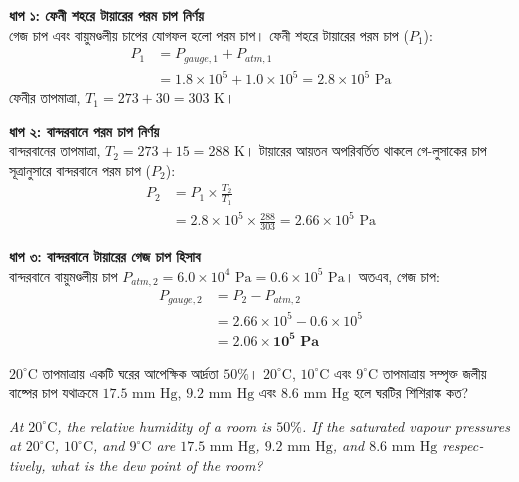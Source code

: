 \documentclass[12pt, a4paper]{article}
\begin{document}
\begin{tcolorbox}[solutionbox={সমাধান (Solution)}]
    \noindent
    \textbf{ধাপ ১: ফেনী শহরে টায়ারের পরম চাপ নির্ণয়} \\
    গেজ চাপ এবং বায়ুমণ্ডলীয় চাপের যোগফল হলো পরম চাপ। ফেনী শহরে টায়ারের পরম চাপ ($P_1$):
    \begin{align*}
        P_1 &= P_{gauge,1} + P_{atm,1} \\
        &= 1.8 \times 10^5 + 1.0 \times 10^5 = 2.8 \times 10^5\text{ Pa}
    \end{align*}
    ফেনীর তাপমাত্রা, $T_1 = 273 + 30 = 303\text{ K}$।
    
    \vspace{0.4em}
    \noindent\textbf{ধাপ ২: বান্দরবানে পরম চাপ নির্ণয়} \\
    বান্দরবানের তাপমাত্রা, $T_2 = 273 + 15 = 288\text{ K}$। টায়ারের আয়তন অপরিবর্তিত থাকলে গে-লুসাকের চাপ সূত্রানুসারে বান্দরবানে পরম চাপ ($P_2$):
    \begin{align*}
        P_2 &= P_1 \times \frac{T_2}{T_1} \\
        &= 2.8 \times 10^5 \times \frac{288}{303} = 2.66 \times 10^5\text{ Pa}
    \end{align*}
    
    \vspace{0.4em}
    \noindent\textbf{ধাপ ৩: বান্দরবানে টায়ারের গেজ চাপ হিসাব} \\
    বান্দরবানে বায়ুমণ্ডলীয় চাপ $P_{atm,2} = 6.0 \times 10^4\text{ Pa} = 0.6 \times 10^5\text{ Pa}$। অতএব, গেজ চাপ:
    \begin{align*}
        P_{gauge,2} &= P_2 - P_{atm,2} \\
        &= 2.66 \times 10^5 - 0.6 \times 10^5 \\
        &= \mathbf{2.06 \times 10^5\text{ Pa}}
    \end{align*}
\end{tcolorbox}
\begin{tcolorbox}[questionbox={প্রশ্ন (Question) 14}]
    \noindent
    $20^\circ\text{C}$ তাপমাত্রায় একটি ঘরের আপেক্ষিক আর্দ্রতা $50\%$। $20^\circ\text{C}$, $10^\circ\text{C}$ এবং $9^\circ\text{C}$ তাপমাত্রায় সম্পৃক্ত জলীয় বাষ্পের চাপ যথাক্রমে $17.5\text{ mm Hg}$, $9.2\text{ mm Hg}$ এবং $8.6\text{ mm Hg}$ হলে ঘরটির শিশিরাঙ্ক কত?
    
    \vspace{0.8em}
    \begin{english}
    \noindent\textit{\color{darkgray}
    At $20^\circ\text{C}$, the relative humidity of a room is $50\%$. If the saturated vapour pressures at $20^\circ\text{C}$, $10^\circ\text{C}$, and $9^\circ\text{C}$ are $17.5\text{ mm Hg}$, $9.2\text{ mm Hg}$, and $8.6\text{ mm Hg}$ respectively, what is the dew point of the room?
    }
    \end{english}
\end{tcolorbox}
\end{document}
